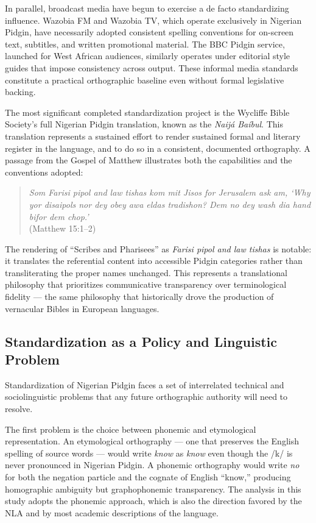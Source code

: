 \documentclass[12pt]{article}
\begin{document}
In parallel, broadcast media have begun to exercise a de facto standardizing influence. Wazobia FM and Wazobia TV, which operate exclusively in Nigerian Pidgin, have necessarily adopted consistent spelling conventions for on-screen text, subtitles, and written promotional material. The BBC Pidgin service, launched for West African audiences, similarly operates under editorial style guides that impose consistency across output. These informal media standards constitute a practical orthographic baseline even without formal legislative backing.

The most significant completed standardization project is the Wycliffe Bible Society's full Nigerian Pidgin translation, known as the \textit{Naijá Baíbul}. This translation represents a sustained effort to render sustained formal and literary register in the language, and to do so in a consistent, documented orthography. A passage from the Gospel of Matthew illustrates both the capabilities and the conventions adopted:

\begin{quote}
\textit{Som Farisi pipol and law tishas kom mit Jisos for Jerusalem ask am, `Why yor disaipols nor dey obey awa eldas tradishon? Dem no dey wash dia hand bifor dem chop.'} \\
(Matthew 15:1--2)
\end{quote}

The rendering of ``Scribes and Pharisees'' as \textit{Farisi pipol and law tishas} is notable: it translates the referential content into accessible Pidgin categories rather than transliterating the proper names unchanged. This represents a translational philosophy that prioritizes communicative transparency over terminological fidelity --- the same philosophy that historically drove the production of vernacular Bibles in European languages.

\subsection{Standardization as a Policy and Linguistic Problem}

Standardization of Nigerian Pidgin faces a set of interrelated technical and sociolinguistic problems that any future orthographic authority will need to resolve.

The first problem is the choice between phonemic and etymological representation. An etymological orthography --- one that preserves the English spelling of source words --- would write \textit{know} as \textit{know} even though the /k/ is never pronounced in Nigerian Pidgin. A phonemic orthography would write \textit{no} for both the negation particle and the cognate of English ``know,'' producing homographic ambiguity but graphophonemic transparency. The analysis in this study adopts the phonemic approach, which is also the direction favored by the NLA and by most academic descriptions of the language.
\end{document}

